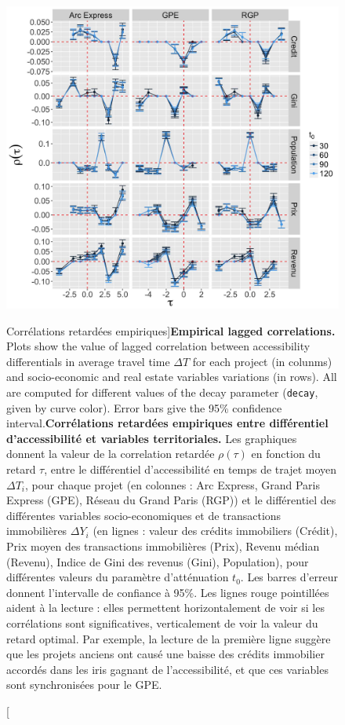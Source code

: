 {}




\begin{figure}[h!]
\includegraphics[width=\linewidth]{Figures/Final/1-2-1-fig-casestudies-empiricalres.jpg}
\caption[Empirical lagged correlations][Corrélations retardées empiriques]{\textbf{Empirical lagged correlations.} Plots show the value of lagged correlation between accessibility differentials in average travel time $\Delta T$ for each project (in colunms) and socio-economic and real estate variables variations (in rows). All are computed for different values of the decay parameter (\texttt{decay}, given by curve color). Error bars give the 95\% confidence interval.\label{fig:empiricalres}}{\textbf{Corrélations retardées empiriques entre différentiel d'accessibilité et variables territoriales.} Les graphiques donnent la valeur de la correlation retardée $\rho(\tau)$ en fonction du retard $\tau$, entre le différentiel d'accessibilité en temps de trajet moyen $\Delta T_i$, pour chaque projet (en colonnes : Arc Express, Grand Paris Express (GPE), Réseau du Grand Paris (RGP)) et le différentiel des différentes variables socio-economiques et de transactions immobilières $\Delta Y_i$ (en lignes : valeur des crédits immobiliers (Crédit), Prix moyen des transactions immobilières (Prix), Revenu médian (Revenu), Indice de Gini des revenus (Gini), Population), pour différentes valeurs du paramètre d'atténuation $t_0$. Les barres d'erreur donnent l'intervalle de confiance à 95\%. Les lignes rouge pointillées aident à la lecture : elles permettent horizontalement de voir si les corrélations sont significatives, verticalement de voir la valeur du retard optimal. Par exemple, la lecture de la première ligne suggère que les projets anciens ont causé une baisse des crédits immobilier accordés dans les iris gagnant de l'accessibilité, et que ces variables sont synchronisées pour le GPE.\label{fig:casestudies:empiricalres}}
\end{figure}

